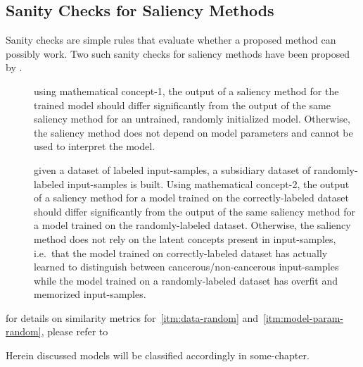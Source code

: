 \subsection{Sanity Checks for Saliency Methods}
Sanity checks are simple rules that evaluate whether a proposed method can possibly work. Two such sanity checks for saliency methods have been proposed by .

\begin{description}
    \item[]
     using mathematical concept-1, the output of a saliency method for the trained model should differ significantly from the output of the same saliency method for an untrained, randomly initialized model. Otherwise, the saliency method does not depend on model parameters and cannot be used to interpret the model.
    \item[] given a dataset of labeled input-samples, a subsidiary dataset of randomly-labeled input-samples is built. Using mathematical concept-2, the output of a saliency method for a model trained on the correctly-labeled dataset should differ significantly from the output of the same saliency method for a model trained on the randomly-labeled dataset. Otherwise, the saliency method does not rely on the latent concepts present in input-samples, i.e.\ that the model trained on correctly-labeled dataset has actually learned to distinguish between cancerous/non-cancerous input-samples while the model trained on a randomly-labeled dataset has overfit and memorized input-samples.
\end{description}
for details on similarity metrics for~\ref{itm:data-random} and~\ref{itm:model-param-random}, please refer to~\cite{Adebayo.2018}

Herein discussed models will be classified accordingly in some-chapter. 